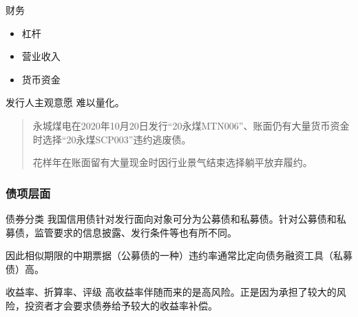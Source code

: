 \begin{frame}{财务}
	\begin{itemize}
		\item 杠杆\cite{王永钦2019杠杆率如何影响资产价格}
		\item 营业收入
		\item 货币资金
	\end{itemize}
\end{frame}

\begin{frame}{发行人主观意愿}
	难以量化。

	\begin{quote}
		永城煤电在2020年10月20日发行“20永煤MTN006”、账面仍有大量货币资金时选择“20永煤SCP003”违约逃废债。

		花样年在账面留有大量现金时因行业景气结束选择躺平放弃履约。
	\end{quote}

\end{frame}
\subsubsection{债项层面}
\begin{frame}{债券分类}
	我国信用债针对发行面向对象可分为公募债和私募债。针对公募债和私募债，监管要求的信息披露、发行条件等也有所不同。

	因此相似期限的中期票据（公募债的一种）违约率通常比定向债务融资工具（私募债）高。
\end{frame}
\begin{frame}{收益率、折算率、评级}
	高收益率伴随而来的是高风险。正是因为承担了较大的风险，投资者才会要求债券给予较大的收益率补偿。
\end{frame}
